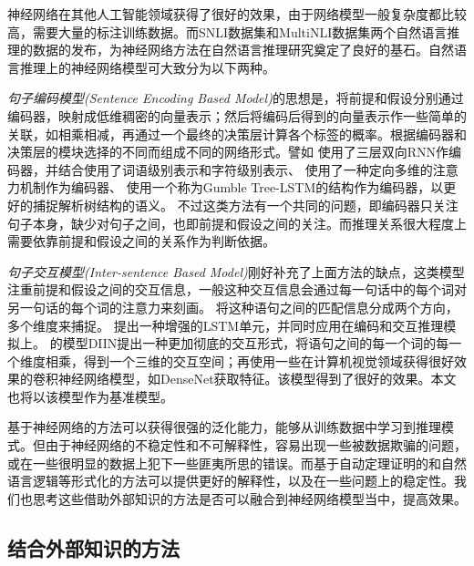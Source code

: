 \documentclass[UTF8,11pt,a4paper,nofonts]{ctexart}
\begin{document}
神经网络在其他人工智能领域获得了很好的效果，由于网络模型一般复杂度都比较高，需要大量的标注训练数据。而SNLI数据集\cite{Bowman2015ALA}和MultiNLI数据集\cite{Nangia2017TheR2}两个自然语言推理的数据的发布，为神经网络方法在自然语言推理研究奠定了良好的基石。自然语言推理上的神经网络模型可大致分为以下两种。

\textit{句子编码模型(Sentence Encoding Based Model)}\cite{Conneau2017SupervisedLO, Yu2017NeuralSE, Chen2017RecurrentNN, Shen2017DiSAN, Choi2017LearningTC}的思想是，将前提和假设分别通过编码器，映射成低维稠密的向量表示；然后将编码后得到的向量表示作一些简单的关联，如相乘相减，再通过一个最终的决策层计算各个标签的概率。根据编码器和决策层的模块选择的不同而组成不同的网络形式。譬如
\cite{Chen2017RecurrentNN}使用了三层双向RNN作编码器，并结合使用了词语级别表示和字符级别表示、
\cite{Shen2017DiSAN}使用了一种定向多维的注意力机制作为编码器、
\cite{Choi2017LearningTC}使用一个称为Gumble Tree-LSTM的结构作为编码器，以更好的捕捉解析树结构的语义。
不过这类方法有一个共同的问题，即编码器只关注句子本身，缺少对句子之间，也即前提和假设之间的关注。而推理关系很大程度上需要依靠前提和假设之间的关系作为判断依据。


\textit{句子交互模型(Inter-sentence Based Model)}\cite{Wang2017Bilateral, Sha2016ReadingAT, chen2017enhanced, yichen2018nli}刚好补充了上面方法的缺点，这类模型注重前提和假设之间的交互信息，一般这种交互信息会通过每一句话中的每个词对另一句话的每个词的注意力来刻画。
\cite{Wang2017Bilateral}将这种语句之间的匹配信息分成两个方向，多个维度来捕捉。
\cite{chen2017enhanced}提出一种增强的LSTM单元，并同时应用在编码和交互推理模拟上。
\cite{yichen2018nli}的模型DIIN提出一种更加彻底的交互形式，将语句之间的每一个词的每一个维度相乘，得到一个三维的交互空间；再使用一些在计算机视觉领域获得很好效果的卷积神经网络模型，如DenseNet\cite{Huang2017DenselyCC}获取特征。该模型得到了很好的效果。本文也将以该模型作为基准模型。

基于神经网络的方法可以获得很强的泛化能力，能够从训练数据中学习到推理模式。但由于神经网络的不稳定性和不可解释性，容易出现一些被数据欺骗的问题，或在一些很明显的数据上犯下一些匪夷所思的错误。而基于自动定理证明的和自然语言逻辑等形式化的方法可以提供更好的解释性，以及在一些问题上的稳定性。我们也思考这些借助外部知识的方法是否可以融合到神经网络模型当中，提高效果。




\subsection{结合外部知识的方法}
\end{document}
